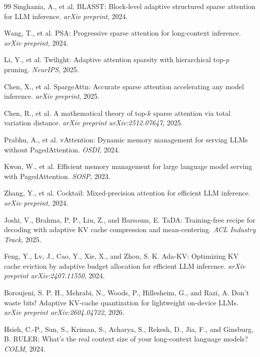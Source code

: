 \documentclass[11pt,a4paper]{article}
\theoremstyle{definition}
\theoremstyle{remark}
\begin{document}
\begin{thebibliography}{99}
Singhania, A., et al.
\newblock BLASST: Block-level adaptive structured sparse attention for LLM inference.
\newblock \emph{arXiv preprint}, 2024.

Wang, T., et al.
\newblock PSA: Progressive sparse attention for long-context inference.
\newblock \emph{arXiv preprint}, 2024.

Li, Y., et al.
\newblock Twilight: Adaptive attention sparsity with hierarchical top-$p$ pruning.
\newblock \emph{NeurIPS}, 2025.

Chen, X., et al.
\newblock SpargeAttn: Accurate sparse attention accelerating any model inference.
\newblock \emph{arXiv preprint}, 2025.

Chen, R., et al.
\newblock A mathematical theory of top-$k$ sparse attention via total variation distance.
\newblock \emph{arXiv preprint arXiv:2512.07647}, 2025.

Prabhu, A., et al.
\newblock vAttention: Dynamic memory management for serving LLMs without PagedAttention.
\newblock \emph{OSDI}, 2024.

Kwon, W., et al.
\newblock Efficient memory management for large language model serving with PagedAttention.
\newblock \emph{SOSP}, 2023.

Zhang, Y., et al.
\newblock Cocktail: Mixed-precision attention for efficient LLM inference.
\newblock \emph{arXiv preprint}, 2024.

Joshi, V., Brahma, P. P., Liu, Z., and Barsoum, E.
\newblock TaDA: Training-free recipe for decoding with adaptive KV cache compression and mean-centering.
\newblock \emph{ACL Industry Track}, 2025.

Feng, Y., Lv, J., Cao, Y., Xie, X., and Zhou, S. K.
\newblock Ada-KV: Optimizing KV cache eviction by adaptive budget allocation for efficient LLM inference.
\newblock \emph{arXiv preprint arXiv:2407.11550}, 2024.

Boroujeni, S. P. H., Mehrabi, N., Woods, P., Hillesheim, G., and Razi, A.
\newblock Don't waste bits! Adaptive KV-cache quantization for lightweight on-device LLMs.
\newblock \emph{arXiv preprint arXiv:2604.04722}, 2026.

Hsieh, C.-P., Sun, S., Kriman, S., Acharya, S., Rekesh, D., Jia, F., and Ginsburg, B.
\newblock RULER: What's the real context size of your long-context language models?
\newblock \emph{COLM}, 2024.


\end{thebibliography}
\end{document}
